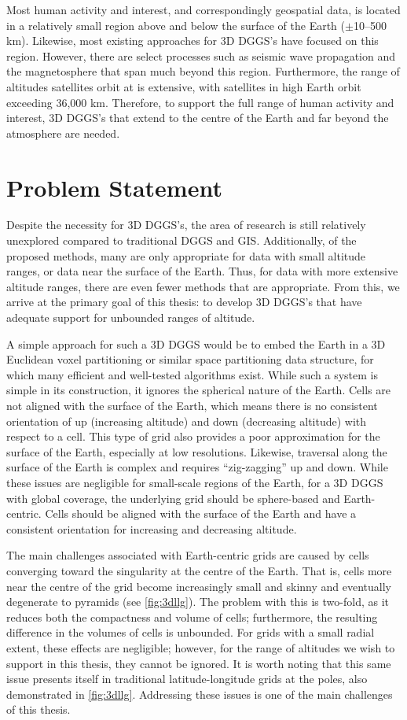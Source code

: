 Most human activity and interest, and correspondingly geospatial data, is located in a relatively small region above and below the surface of the Earth ($\pm$10--500 km).
Likewise, most existing approaches for 3D DGGS's have focused on this region.
However, there are select processes such as seismic wave propagation and the magnetosphere that span much beyond this region.
Furthermore, the range of altitudes satellites orbit at is extensive, with satellites in high Earth orbit exceeding 36,000 km.
Therefore, to support the full range of human activity and interest, 3D DGGS's that extend to the centre of the Earth and far beyond the atmosphere are needed.


\section{Problem Statement} \label{chap:1:problem}
Despite the necessity for 3D DGGS's, the area of research is still relatively unexplored compared to traditional DGGS and GIS.
Additionally, of the proposed methods, many are only appropriate for data with small altitude ranges, or data near the surface of the Earth.
Thus, for data with more extensive altitude ranges, there are even fewer methods that are appropriate. 
From this, we arrive at the primary goal of this thesis: to develop 3D DGGS's that have adequate support for unbounded ranges of altitude. 


A simple approach for such a 3D DGGS would be to embed the Earth in a 3D Euclidean voxel partitioning or similar space partitioning data structure, for which many efficient and well-tested algorithms exist.
While such a system is simple in its construction, it ignores the spherical nature of the Earth.
Cells are not aligned with the surface of the Earth, which means there is no consistent orientation of up (increasing altitude) and down (decreasing altitude) with respect to a cell.
This type of grid also provides a poor approximation for the surface of the Earth, especially at low resolutions.
Likewise, traversal along the surface of the Earth is complex and requires ``zig-zagging'' up and down.
While these issues are negligible for small-scale regions of the Earth, for a 3D DGGS with global coverage, the underlying grid should be sphere-based and Earth-centric.
Cells should be aligned with the surface of the Earth and have a consistent orientation for increasing and decreasing altitude.


The main challenges associated with Earth-centric grids are caused by cells converging toward the singularity at the centre of the Earth.
That is, cells more near the centre of the grid become increasingly small and skinny and eventually degenerate to pyramids
(see \cref{fig:3dllg}).
The problem with this is two-fold, as it reduces both the compactness and volume of cells; furthermore, the resulting difference in the volumes of cells is unbounded.
For grids with a small radial extent, these effects are negligible; however, for the range of altitudes we wish to support in this thesis, they cannot be ignored.
It is worth noting that this same issue presents itself in traditional latitude-longitude grids at the poles, also demonstrated in \cref{fig:3dllg}.
Addressing these issues is one of the main challenges of this thesis.


